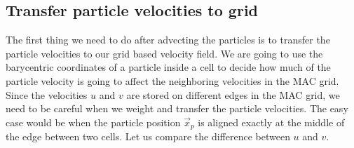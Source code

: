 \subsection{Transfer particle velocities to grid}

The first thing we need to do after advecting the particles is to transfer the particle velocities to our grid based velocity field. We are going to use the barycentric coordinates of a particle inside a cell to decide how much of the particle velocity is going to affect the neighboring velocities in the MAC grid. Since the velocities $u$ and $v$ are stored on different edges in the MAC grid, we need to be careful when we weight and transfer the particle velocities. The easy case would be when the particle position $\vec{x}_p$ is aligned exactly at the middle of the edge between two cells. Let us compare the difference between $u$ and $v$. 

